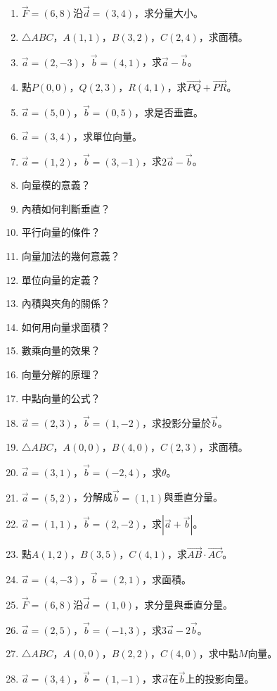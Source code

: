 \begin{enumerate}[label=\arabic*.]
    \item $\vec{F} = (6, 8)$沿$\vec{d} = (3, 4)$，求分量大小。
    \item $\triangle ABC$，$A(1, 1)$，$B(3, 2)$，$C(2, 4)$，求面積。
    \item $\vec{a} = (2, -3)$，$\vec{b} = (4, 1)$，求$\vec{a} - \vec{b}$。
    \item 點$P(0, 0)$，$Q(2, 3)$，$R(4, 1)$，求$\vec{PQ} + \vec{PR}$。
    \item $\vec{a} = (5, 0)$，$\vec{b} = (0, 5)$，求是否垂直。
    \item $\vec{a} = (3, 4)$，求單位向量。
    \item $\vec{a} = (1, 2)$，$\vec{b} = (3, -1)$，求$2\vec{a} - \vec{b}$。
    \item 向量模的意義？
    \item 內積如何判斷垂直？
    \item 平行向量的條件？
    \item 向量加法的幾何意義？
    \item 單位向量的定義？
    \item 內積與夾角的關係？
    \item 如何用向量求面積？
    \item 數乘向量的效果？
    \item 向量分解的原理？
    \item 中點向量的公式？
    \item $\vec{a} = (2, 3)$，$\vec{b} = (1, -2)$，求投影分量於$\vec{b}$。
    \item $\triangle ABC$，$A(0, 0)$，$B(4, 0)$，$C(2, 3)$，求面積。
    \item $\vec{a} = (3, 1)$，$\vec{b} = (-2, 4)$，求$\theta$。
    \item $\vec{a} = (5, 2)$，分解成$\vec{b} = (1, 1)$與垂直分量。
    \item $\vec{a} = (1, 1)$，$\vec{b} = (2, -2)$，求$|\vec{a} + \vec{b}|$。
    \item 點$A(1, 2)$，$B(3, 5)$，$C(4, 1)$，求$\vec{AB} \cdot \vec{AC}$。
    \item $\vec{a} = (4, -3)$，$\vec{b} = (2, 1)$，求面積。
    \item $\vec{F} = (6, 8)$沿$\vec{d} = (1, 0)$，求分量與垂直分量。
    \item $\vec{a} = (2, 5)$，$\vec{b} = (-1, 3)$，求$3\vec{a} - 2\vec{b}$。
    \item $\triangle ABC$，$A(0, 0)$，$B(2, 2)$，$C(4, 0)$，求中點$M$向量。
    \item $\vec{a} = (3, 4)$，$\vec{b} = (1, -1)$，求$\vec{a}$在$\vec{b}$上的投影向量。

\end{enumerate}
